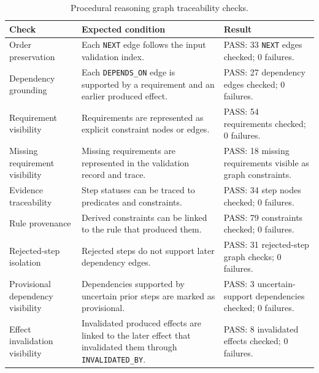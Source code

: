 \begin{table}[htbp]
\centering
\caption{Procedural reasoning graph traceability checks.}
\label{tab:evaluation-graph-traceability}
\small
\begin{tabular}{p{} p{} p{}}
\toprule
Check & Expected condition & Result \\
\midrule
Order preservation &
Each \texttt{NEXT} edge follows the input validation index. &
PASS: 33 \texttt{NEXT} edges checked; 0 failures. \\

Dependency grounding &
Each \texttt{DEPENDS\_ON} edge is supported by a requirement and an earlier produced effect. &
PASS: 27 dependency edges checked; 0 failures. \\

Requirement visibility &
Requirements are represented as explicit constraint nodes or edges. &
PASS: 54 requirements checked; 0 failures. \\

Missing requirement visibility &
Missing requirements are represented in the validation record and trace. &
PASS: 18 missing requirements visible as graph constraints. \\

Evidence traceability &
Step statuses can be traced to predicates and constraints. &
PASS: 34 step nodes checked; 0 failures. \\

Rule provenance &
Derived constraints can be linked to the rule that produced them. &
PASS: 79 constraints checked; 0 failures. \\

Rejected-step isolation &
Rejected steps do not support later dependency edges. &
PASS: 31 rejected-step graph checks; 0 failures. \\

Provisional dependency visibility &
Dependencies supported by uncertain prior steps are marked as provisional. &
PASS: 3 uncertain-support dependencies checked; 0 failures. \\

Effect invalidation visibility &
Invalidated produced effects are linked to the later effect that invalidated them through \texttt{INVALIDATED\_BY}. &
PASS: 8 invalidated effects checked; 0 failures. \\
\bottomrule
\end{tabular}
\end{table}

